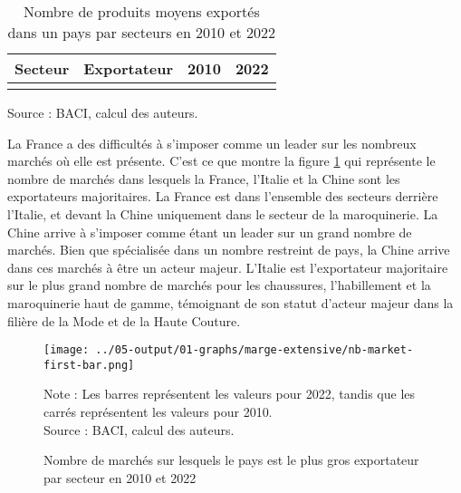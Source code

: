 \documentclass[french,10pt,a4paper]{article}
\begin{document}
\begin{table}[ht]
  \centering
  \begin{tabular}{|c|c|c|c|}
    \hline
   Secteur & Exportateur & 2010 & 2022 \\
    \hline
    \\
    \hline
  \end{tabular}
  \captionsetup{justification=raggedright,singlelinecheck=false, font=small}
  \caption*{Source : BACI, calcul des auteurs.}
  \captionsetup{justification=centering, singlelinecheck=true, font=normalsize}
  \caption{Nombre de produits moyens exportés dans un pays par secteurs en 2010 et 2022}
  \label{tab:table-nb-mean-product-export}
\end{table}

La France a des difficultés à s'imposer comme un leader sur les nombreux marchés où elle est présente. C'est ce que montre la figure \ref{fig:nb-market-first-bar} qui représente le nombre de marchés dans lesquels la France, l'Italie et la Chine sont les exportateurs majoritaires. La France est dans l'ensemble des secteurs derrière l'Italie, et devant la Chine uniquement dans le secteur de la maroquinerie. La Chine arrive à s'imposer comme étant un leader sur un grand nombre de marchés. Bien que spécialisée dans un nombre restreint de pays, la Chine arrive dans ces marchés à être un acteur majeur. L'Italie est l'exportateur majoritaire sur le plus grand nombre de marchés pour les chaussures, l'habillement et la maroquinerie haut de gamme, témoignant de son statut d'acteur majeur dans la filière de la Mode et de la Haute Couture.


\begin{figure}[!h]
  \centering  \texttt{[image: ../05-output/01-graphs/marge-extensive/nb-market-first-bar.png]}
  \captionsetup{justification=justified, singlelinecheck=false, font=small}
  \caption*{Note : Les barres représentent les valeurs pour 2022, tandis que les carrés représentent les valeurs pour 2010. \\
  Source : BACI, calcul des auteurs.}
  \captionsetup{justification=centering, singlelinecheck=true, font=normalsize}
  \caption{Nombre de marchés sur lesquels le pays est le plus gros exportateur par secteur en 2010 et 2022}
  \label{fig:nb-market-first-bar}
\end{figure}
\end{document}
